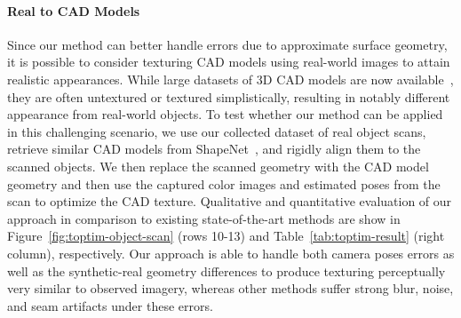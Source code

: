 \paragraph*{Real to CAD Models}
Since our method can better handle errors due to approximate surface geometry, it is possible to consider texturing CAD models using real-world images to attain realistic appearances.   While large datasets of 3D CAD models are now available~\cite{chang2015shapenet}, they are often untextured or textured simplistically, resulting in notably different appearance from real-world objects. 
To test whether our method can be applied in this challenging scenario, 
we use our collected dataset of real object scans, retrieve similar CAD models from ShapeNet~\cite{chang2015shapenet}, and rigidly align them to the scanned objects.
We then replace the scanned geometry with the CAD model geometry and then use the captured color images and estimated poses from the scan to optimize the CAD texture.
Qualitative and quantitative evaluation of our approach in comparison to existing state-of-the-art methods are show in Figure~\ref{fig:toptim-object-scan} (rows 10-13) and Table~\ref{tab:toptim-result} (right column), respectively.
Our approach is able to handle both camera poses errors as well as the synthetic-real geometry differences to produce texturing perceptually very similar to observed imagery, whereas other methods suffer strong blur, noise, and seam artifacts under these errors.

